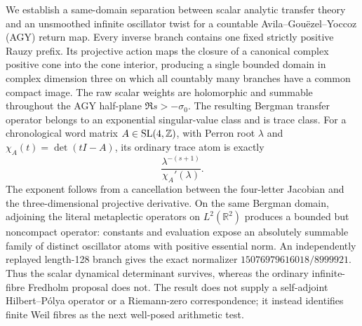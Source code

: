 We establish a same-domain separation between scalar analytic transfer
theory and an unsmoothed infinite oscillator twist for a countable
Avila--Gou\"ezel--Yoccoz (AGY) return map.  Every inverse branch contains one
fixed strictly positive Rauzy prefix.  Its projective action maps the closure
of a canonical complex positive cone into the cone interior, producing a
single bounded domain in complex dimension three on which all countably many
branches have a common compact image.  The raw scalar weights are
holomorphic and summable throughout the AGY half-plane
\(\Re s> -\sigma _0\).  The resulting Bergman transfer operator belongs to
an exponential singular-value class and is trace class.  For a chronological
word matrix \(A\in\operatorname{SL}(4,\mathbb Z)\), with Perron root \(\lambda\) and
\(\chi_A(t)=\det(tI-A)\), its ordinary trace atom is exactly
\[
  \frac{\lambda^{-(s+1)}}{\chi_A'(\lambda)}.
\]
The exponent follows from a cancellation between the four-letter Jacobian
and the three-dimensional projective derivative.  On the same Bergman
domain, adjoining the literal metaplectic operators on
\(L^2(\mathbb R^2)\) produces a bounded but noncompact operator: constants
and evaluation expose an absolutely summable family of distinct oscillator
atoms with positive essential norm.  An independently replayed length-128
branch gives the exact normalizer
\(15076979616018/8999921\).  Thus the scalar dynamical determinant survives,
whereas the ordinary infinite-fibre Fredholm proposal does not.  The result
does not supply a self-adjoint Hilbert--P\'olya operator or a Riemann-zero
correspondence; it instead identifies finite Weil fibres as the next
well-posed arithmetic test.
